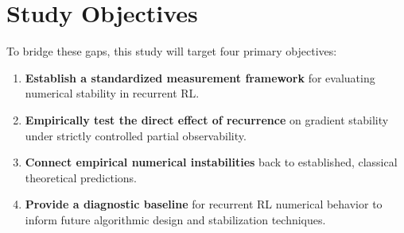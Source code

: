 \documentclass[11pt,a4paper]{article}
\begin{document}
\section{Study Objectives}
To bridge these gaps, this study will target four primary objectives:
\begin{enumerate}
    \item \textbf{Establish a standardized measurement framework} for evaluating numerical stability in recurrent RL.
    \item \textbf{Empirically test the direct effect of recurrence} on gradient stability under strictly controlled partial observability.
    \item \textbf{Connect empirical numerical instabilities} back to established, classical theoretical predictions.
    \item \textbf{Provide a diagnostic baseline} for recurrent RL numerical behavior to inform future algorithmic design and stabilization techniques.
\end{enumerate}
\end{document}
